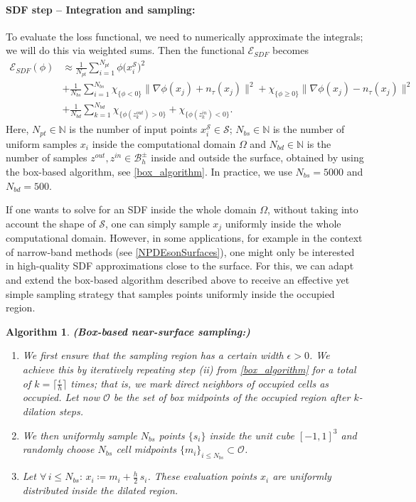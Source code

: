 \documentclass[12pt,openany]{book}
\def\S{\mathcal{S}}
\theoremstyle{plainnormal}
\newtheorem{algorithm}[theorem]{Algorithm}
\theoremstyle{remark}
\begin{document}
\paragraph{SDF step -- Integration and sampling:} To evaluate the loss functional, we need to numerically approximate the integrals; we will do this via weighted sums. Then the functional $\mathcal{E}_{SDF}$ becomes
\begin{align*}
    \mathcal{E}_{SDF}(\phi) &\approx 
 \frac{1}{N_{pt}}\sum_{i=1}^{N_{pt}}\phi\big( x_i^\S\big)^2\\ &+ \frac{1}{N_{bs}}\sum_{i=1}^{N_{bs}}
\chi_{\{\phi < 0\}} \|\nabla \phi(x_j) + n_\tau(x_j)\|^2 + \chi_{\{\phi \geq 0\}} \|\nabla \phi(x_j) - n_\tau(x_j)\|^2  \\&+\frac{1}{N_{bd}} \sum^{N_{bd}}_{k = 1}\chi_{\{\phi(z^{out}_k) > 0\}} + \chi_{\{\phi(z^{in}_k) < 0\}}.
\end{align*}
Here, $N_{pt}\in \mathbb{N}$ is the number of input points $x_i^\S \in \mathcal S$;  $N_{bs}\in \mathbb{N}$ is the number of uniform samples $x_i$ inside the computational domain $\Omega$ and $N_{bd}\in \mathbb{N}$ is the number of samples $z^{out}, z^{in} \in \mathcal{B}_h^\pm$ inside and outside the surface, obtained by using the box-based algorithm, see \cref{box_algorithm}. In practice, we use $N_{bs} = 5000$ and $N_{bd} = 500$.\par
If one wants to solve for an SDF inside the whole domain $\Omega$, without taking into account the shape of $\S$, one can simply sample $x_j$ uniformly inside the whole computational domain. However, in some applications, for example in the context of narrow-band methods (see \cref{NPDEsonSurfaces}), one might only be interested in high-quality SDF approximations close to the surface. For this, we can adapt and extend the box-based algorithm described above to receive an effective yet simple sampling strategy that samples points uniformly inside the occupied region.
\begin{algorithm}\label{clever_sampling}\textbf{(Box-based near-surface sampling:)}
  \begin{enumerate}
      \item We first ensure that the sampling region has a certain width $\epsilon > 0$. We achieve this by iteratively repeating step (ii) from \cref{box_algorithm} for a total of $k = \lceil \frac{\epsilon}{h} \rceil$ times; that is, we mark direct neighbors of occupied cells as occupied. Let now $\mathcal{O}$ be the set of box midpoints of the occupied region after $k$-dilation steps. 
      \item We then uniformly sample $N_{bs}$ points $\{s_i\}$ inside the unit cube $[-1,1]^3$ and randomly choose $N_{bs}$ cell midpoints $\{m_i\}_{i \leq N_{bs}} \subset \mathcal O$.
      \item Let $\forall\, i \leq N_{bs}: \,x_i \coloneqq m_i + \frac{h}{2}\,s_i$. These evaluation points $x_i$ are uniformly distributed inside the dilated region.
  \end{enumerate}  
\end{algorithm}
\end{document}

